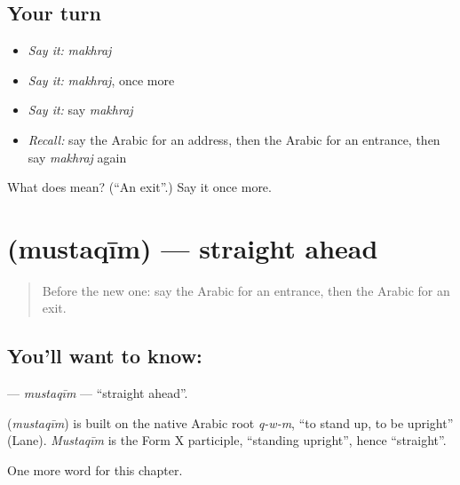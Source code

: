 \subsection*{Your turn}
\begin{itemize}
\raggedright
  \item \emph{Say it:} \emph{makhraj}
  \item \emph{Say it:} \emph{makhraj}, once more
  \item \emph{Say it:} say \emph{makhraj}
  \item \emph{Recall:} say the Arabic for an address, then the Arabic for an entrance, then say \emph{makhraj} again
\end{itemize}

\begin{tcolorbox}[breakable,colback=teal!4,colframe=teal!35!black,title={Before you move on}]
What does  mean? (\textquotedblleft{}An exit\textquotedblright{}.) Say it once more.
\end{tcolorbox}
\section[\texorpdfstring{\ar{مستقيم} (mustaqīm)}{مستقيم (mustaqīm)}]{ (mustaqīm) — straight ahead}

\label{lesson:AR-C105-mustaqim}



\begin{quote}
Before the new one: say the Arabic for an entrance, then the Arabic for an exit.
\end{quote}

\subsection*{You'll want to know: }
\textbf{} — \emph{mustaqīm} — \textquotedblleft{}straight ahead\textquotedblright{}.

\begin{cousinweb}
\textbf{} (\emph{mustaqīm}) is built on the native Arabic root \emph{q-w-m}, \textquotedblleft{}to stand up, to be upright\textquotedblright{} (Lane). \emph{Mustaqīm} is the Form X participle, \textquotedblleft{}standing upright\textquotedblright{}, hence \textquotedblleft{}straight\textquotedblright{}.
\end{cousinweb}

\begin{grammarlens}[title={What you've built}]
One more word for this chapter.
\end{grammarlens}

